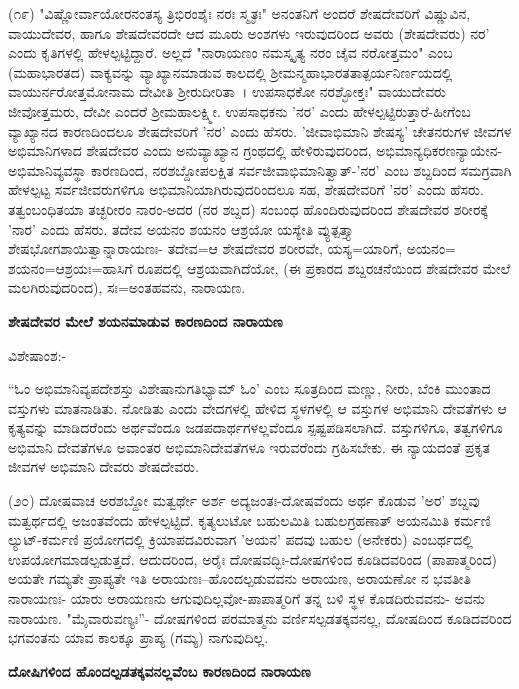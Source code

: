 (೧೯) "ವಿಷ್ಣೋರ್ವಾಯೋರನಂತಸ್ಯ ತ್ರಿಭಿರಂಶೈಃ ನರಃ ಸ್ಮೃತಃ" ಅನಂತನಿಗೆ ಅಂದರೆ ಶೇಷದೇವರಿಗೆ ವಿಷ್ಣುವಿನ, ವಾಯುದೇವರ, ಹಾಗೂ ಶೇಷದೇವರದೇ ಆದ ಮೂರು ಅಂಶಗಳು ಇರುವುದರಿಂದ ಅವರು (ಶೇಷದೇವರು) ನರ' ಎಂದು ಕೃತಿಗಳಲ್ಲಿ ಹೇಳಲ್ಪಟ್ಟಿದ್ದಾರೆ. ಅಲ್ಲದೆ "ನಾರಾಯಣಂ ನಮಸ್ಕೃತ್ಯ ನರಂ ಚೈವ ನರೋತ್ತಮಂ" ಎಂಬ (ಮಹಾಭಾರತದ) ವಾಕ್ಯವನ್ನು ವ್ಯಾಖ್ಯಾನಮಾಡುವ ಕಾಲದಲ್ಲಿ ಶ‍್ರೀಮನ್ಮಹಾಭಾರತತಾತ್ಪರ್ಯನಿರ್ಣಯದಲ್ಲಿ ವಾಯುರ್ನರೋತ್ತಮೋನಾಮ ದೇವೀತಿ ಶ‍್ರೀರುದೀರಿತಾ~। ಉಪಸಾಧಕೋ ನರಶ್ಛೋಕ್ತಃ" ವಾಯುದೇವರು ಜೀವೋತ್ತಮರು, ದೇವೀ ಎಂದರೆ ಶ‍್ರೀಮಹಾಲಕ್ಷ್ಮೀ. ಉಪಸಾಧಕನು 'ನರ' ಎಂದು ಹೇಳಲ್ಪಟ್ಟಿರುತ್ತಾರೆ-ಹೀಗೆಂಬ ವ್ಯಾಖ್ಯಾನದ ಕಾರಣದಿಂದಲೂ ಶೇಷದೇವರಿಗೆ 'ನರ' ಎಂದು ಹೆಸರು. 'ಜೀವಾಭಿಮಾನಿ ಶೇಷಸ್ಯ' ಚೇತನರುಗಳ ಜೀವಗಳ ಅಭಿಮಾನಿಗಳಾದ ಶೇಷದೇವರ ಎಂದು ಅನುವ್ಯಾಖ್ಯಾನ ಗ್ರಂಥದಲ್ಲಿ ಹೇಳಿರುವುದರಿಂದ, ಅಭಿಮಾನ್ಯಧಿಕರಣನ್ಯಾಯೇನ-ಅಭಿಮಾನಿವ್ಯವಸ್ಥಾ ಕಾರಣದಿಂದ, ನರಶಬ್ದೋಪಲಕ್ಷಿತ ಸರ್ವಜೀವಾಭಿಮಾನಿತ್ವಾತ್-'ನರ' ಎಂಬ ಶಬ್ದದಿಂದ ಸಮಗ್ರವಾಗಿ ಹೇಳಲ್ಪಟ್ಟ ಸರ್ವಜೀವರುಗಳಿಗೂ ಅಭಿಮಾನಿಯಾಗಿರುವುದರಿಂದಲೂ ಸಹ, ಶೇಷದೇವರಿಗೆ 'ನರ' ಎಂದು ಹೆಸರು. ತತ್ವಂಬಂಧಿತಯಾ ತಚ್ಛರೀರಂ ನಾರಂ-ಅದರ (ನರ ಶಬ್ದದ) ಸಂಬಂಧ ಹೊಂದಿರುವುದರಿಂದ ಶೇಷದೇವರ ಶರೀರಕ್ಕೆ 'ನಾರ' ಎಂದು ಹೆಸರು. ತದೇವ ಅಯನಂ ಶಯನಂ ಆಶ್ರಯೋ ಯಸ್ಯೇತಿ ವ್ಯುತ್ಪತ್ತ್ಯಾ ಶೇಷಭೋಗಶಾಯಿತ್ವಾನ್ನಾರಾಯಣಃ- ತದೇವ=ಆ ಶೇಷದೇವರ ಶರೀರವೇ, ಯಸ್ಯ=ಯಾರಿಗೆ, ಅಯನಂ= ಶಯನಂ=ಆಶ್ರಯಃ=ಹಾಸಿಗೆ ರೂಪದಲ್ಲಿ ಆಶ್ರಯವಾಗಿದೆಯೋ, (ಈ ಪ್ರಕಾರದ ಶಬ್ದರಚನೆಯಿಂದ ಶೇಷದೇವರ ಮೇಲೆ ಮಲಗಿರುವುದರಿಂದ), ಸಃ=ಅಂತಹವನು, ನಾರಾಯಣ.

\begin{center}
\textbf{ಶೇಷದೇವರ ಮೇಲೆ ಶಯನಮಾಡುವ ಕಾರಣದಿಂದ ನಾರಾಯಣ}
\end{center}

\noindent
ವಿಶೇಷಾಂಶ:-

“ಓಂ ಅಭಿಮಾನಿವ್ಯಪದೇಶಸ್ತು ವಿಶೇಷಾನುಗತಿಭ್ಯಾಮ್ ಓಂ' ಎಂಬ ಸೂತ್ರದಿಂದ ಮಣ್ಣು, ನೀರು, ಬೆಂಕಿ ಮುಂತಾದ ವಸ್ತುಗಳು ಮಾತನಾಡಿತು. ನೋಡಿತು ಎಂದು ವೇದಗಳಲ್ಲಿ ಹೇಳಿದ ಸ್ಥಳಗಳಲ್ಲಿ ಆ ವಸ್ತುಗಳ ಅಭಿಮಾನಿ ದೇವತೆಗಳು ಆ ಕೃತ್ಯವನ್ನು ಮಾಡಿದರೆಂದು ಅರ್ಥವೆಂದೂ ಜಡಪದಾರ್ಥಗಳಲ್ಲವೆಂದೂ ಸ್ಪಷ್ಟಪಡಿಸಲಾಗಿದೆ. ವಸ್ತುಗಳಿಗೂ, ತತ್ವಗಳಿಗೂ ಅಭಿಮಾನಿ ದೇವತೆಗಳೂ ಅವಾಂತರ ಅಭಿಮಾನಿದೇವತೆಗಳೂ ಇರುವರೆಂದು ಗ್ರಹಿಸಬೇಕು. ಈ ನ್ಯಾಯದಂತೆ ಪ್ರಕೃತ ಜೀವಗಳ ಅಭಿಮಾನಿ ದೇವರು ಶೇಷದೇವರು.

(೨೦) ದೋಷವಾಚ ಅರಶಬ್ದೋ ಮತ್ವರ್ಥೇ ಅರ್ಶ ಅದ್ಯಜಂತಃ-ದೋಷವೆಂದು ಅರ್ಥ ಕೊಡುವ 'ಅರ' ಶಬ್ದವು ಮತ್ವರ್ಥದಲ್ಲಿ ಅಜಂತವೆಂದು ಹೇಳಲ್ಪಟ್ಟಿದೆ. ಕೃತ್ಯಲುಟೋ ಬಹುಲಮಿತಿ ಬಹುಲಗ್ರಹಣಾತ್ ಅಯನಮಿತಿ ಕರ್ಮಣಿ ಲ್ಯುಟ್-ಕರ್ಮಣಿ ಪ್ರಯೋಗದಲ್ಲಿ ಕ್ರಿಯಾಪದವಿರುವಾಗ 'ಅಯನ' ಪದವು ಬಹುಲ (ಅನೇಕರು) ಎಂಬರ್ಥದಲ್ಲಿ ಉಪಯೋಗಮಾಡಲ್ಪಡುತ್ತದೆ. ಆದುದರಿಂದ, ಅರೈಃ ದೋಷವದ್ಭಿಃ-ದೋಷಗಳಿಂದ ಕೂಡಿದವರಿಂದ (ಪಾಪಾತ್ಮರಿಂದ) ಅಯತೇ ಗಮ್ಯತೇ ಪ್ರಾಪ್ಯತೇ ಇತಿ ಅರಾಯಣಃ--ಹೊಂದಲ್ಪಡುವವನು ಅರಾಯಣ, ಅರಾಯಣೋ ನ ಭವತೀತಿ ನಾರಾಯಣಃ- ಯಾರು ಅರಾಯಣನು ಆಗುವುದಿಲ್ಲವೋ-ಪಾಪಾತ್ಮರಿಗೆ ತನ್ನ ಬಳಿ ಸ್ಥಳ ಕೊಡದಿರುವವನು- ಅವನು ನಾರಾಯಣ. "ಮೈವಾರುವಣ್ಯಃ''- ದೋಷಗಳಿಂದ ಪರಮಾತ್ಮನು ವರ್ಣಿಸಲ್ಪಡತಕ್ಕವನಲ್ಲ, ದೋಷದಿಂದ ಕೂಡಿದವರಿಂದ ಭಗವಂತನು ಯಾವ ಕಾಲಕ್ಕೂ ಪ್ರಾಪ್ಯ (ಗಮ್ಯ) ನಾಗುವುದಿಲ್ಲ.

\begin{center}
\textbf{ದೋಷಿಗಳಿಂದ ಹೊಂದಲ್ಪಡತಕ್ಕವನಲ್ಲವೆಂಬ ಕಾರಣದಿಂದ ನಾರಾಯಣ}
\end{center}

